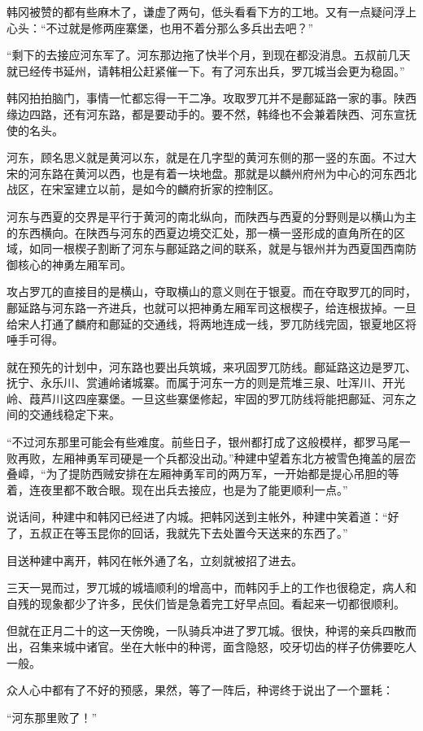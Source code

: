 韩冈被赞的都有些麻木了，谦虚了两句，低头看看下方的工地。又有一点疑问浮上心头：“不过就是修两座寨堡，也用不着分那么多兵出去吧？”

“剩下的去接应河东军了。河东那边拖了快半个月，到现在都没消息。五叔前几天就已经传书延州，请韩相公赶紧催一下。有了河东出兵，罗兀城当会更为稳固。”

韩冈拍拍脑门，事情一忙都忘得一干二净。攻取罗兀并不是鄜延路一家的事。陕西缘边四路，还有河东路，都是要动手的。要不然，韩绛也不会兼着陕西、河东宣抚使的名头。

河东，顾名思义就是黄河以东，就是在几字型的黄河东侧的那一竖的东面。不过大宋的河东路在黄河以西，也是有着一块地盘。那就是以麟州府州为中心的河东西北战区，在宋室建立以前，是如今的麟府折家的控制区。

河东与西夏的交界是平行于黄河的南北纵向，而陕西与西夏的分野则是以横山为主的东西横向。在陕西与河东的西夏边境交汇处，那一横一竖形成的直角所在的区域，如同一根楔子割断了河东与鄜延路之间的联系，就是与银州并为西夏国西南防御核心的神勇左厢军司。

攻占罗兀的直接目的是横山，夺取横山的意义则在于银夏。而在夺取罗兀的同时，鄜延路与河东路一齐进兵，也就可以把神勇左厢军司这根楔子，给连根拔掉。一旦给宋人打通了麟府和鄜延的交通线，将两地连成一线，罗兀防线完固，银夏地区将唾手可得。

就在预先的计划中，河东路也要出兵筑城，来巩固罗兀防线。鄜延路这边是罗兀、抚宁、永乐川、赏逋岭诸城寨。而属于河东一方的则是荒堆三泉、吐浑川、开光岭、葭芦川这四座寨堡。一旦这些寨堡修起，牢固的罗兀防线将能把鄜延、河东之间的交通线稳定下来。

“不过河东那里可能会有些难度。前些日子，银州都打成了这般模样，都罗马尾一败再败，左厢神勇军司硬是一个兵都没出动。”种建中望着东北方被雪色掩盖的层峦叠嶂，“为了提防西贼安排在左厢神勇军司的两万军，一开始都是提心吊胆的等着，连夜里都不敢合眼。现在出兵去接应，也是为了能更顺利一点。”

说话间，种建中和韩冈已经进了内城。把韩冈送到主帐外，种建中笑着道：“好了，五叔正在等玉昆你的回话，我就先下去处置今天送来的东西了。”

目送种建中离开，韩冈在帐外通了名，立刻就被招了进去。

三天一晃而过，罗兀城的城墙顺利的增高中，而韩冈手上的工作也很稳定，病人和自残的现象都少了许多，民伕们皆是急着完工好早点回。看起来一切都很顺利。

但就在正月二十的这一天傍晚，一队骑兵冲进了罗兀城。很快，种谔的亲兵四散而出，召集来城中诸官。坐在大帐中的种谔，面含隐怒，咬牙切齿的样子仿佛要吃人一般。

众人心中都有了不好的预感，果然，等了一阵后，种谔终于说出了一个噩耗：

“河东那里败了！”


